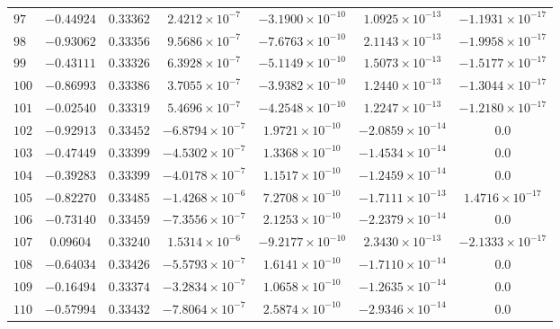 \begin{landscape}
\begin{center}
\begin{longtable}{lcccccc}
$97$ & $-0.44924$ & $0.33362$ & $2.4212\times{}10^{-7}$ & $-3.1900\times{}10^{-10}$ & $1.0925\times{}10^{-13}$ & $-1.1931\times{}10^{-17}$ \\
$98$ & $-0.93062$ & $0.33356$ & $9.5686\times{}10^{-7}$ & $-7.6763\times{}10^{-10}$ & $2.1143\times{}10^{-13}$ & $-1.9958\times{}10^{-17}$ \\
$99$ & $-0.43111$ & $0.33326$ & $6.3928\times{}10^{-7}$ & $-5.1149\times{}10^{-10}$ & $1.5073\times{}10^{-13}$ & $-1.5177\times{}10^{-17}$ \\
$100$ & $-0.86993$ & $0.33386$ & $3.7055\times{}10^{-7}$ & $-3.9382\times{}10^{-10}$ & $1.2440\times{}10^{-13}$ & $-1.3044\times{}10^{-17}$ \\
$101$ & $-0.02540$ & $0.33319$ & $5.4696\times{}10^{-7}$ & $-4.2548\times{}10^{-10}$ & $1.2247\times{}10^{-13}$ & $-1.2180\times{}10^{-17}$ \\
$102$ & $-0.92913$ & $0.33452$ & $-6.8794\times{}10^{-7}$ & $1.9721\times{}10^{-10}$ & $-2.0859\times{}10^{-14}$ & $0.0$ \\
$103$ & $-0.47449$ & $0.33399$ & $-4.5302\times{}10^{-7}$ & $1.3368\times{}10^{-10}$ & $-1.4534\times{}10^{-14}$ & $0.0$ \\
$104$ & $-0.39283$ & $0.33399$ & $-4.0178\times{}10^{-7}$ & $1.1517\times{}10^{-10}$ & $-1.2459\times{}10^{-14}$ & $0.0$ \\
$105$ & $-0.82270$ & $0.33485$ & $-1.4268\times{}10^{-6}$ & $7.2708\times{}10^{-10}$ & $-1.7111\times{}10^{-13}$ & $1.4716\times{}10^{-17}$ \\
$106$ & $-0.73140$ & $0.33459$ & $-7.3556\times{}10^{-7}$ & $2.1253\times{}10^{-10}$ & $-2.2379\times{}10^{-14}$ & $0.0$ \\
$107$ & $0.09604$ & $0.33240$ & $1.5314\times{}10^{-6}$ & $-9.2177\times{}10^{-10}$ & $2.3430\times{}10^{-13}$ & $-2.1333\times{}10^{-17}$ \\
$108$ & $-0.64034$ & $0.33426$ & $-5.5793\times{}10^{-7}$ & $1.6141\times{}10^{-10}$ & $-1.7110\times{}10^{-14}$ & $0.0$ \\
$109$ & $-0.16494$ & $0.33374$ & $-3.2834\times{}10^{-7}$ & $1.0658\times{}10^{-10}$ & $-1.2635\times{}10^{-14}$ & $0.0$ \\
$110$ & $-0.57994$ & $0.33432$ & $-7.8064\times{}10^{-7}$ & $2.5874\times{}10^{-10}$ & $-2.9346\times{}10^{-14}$ & $0.0$ \\
  \end{longtable}
\end{center}


\end{landscape}
